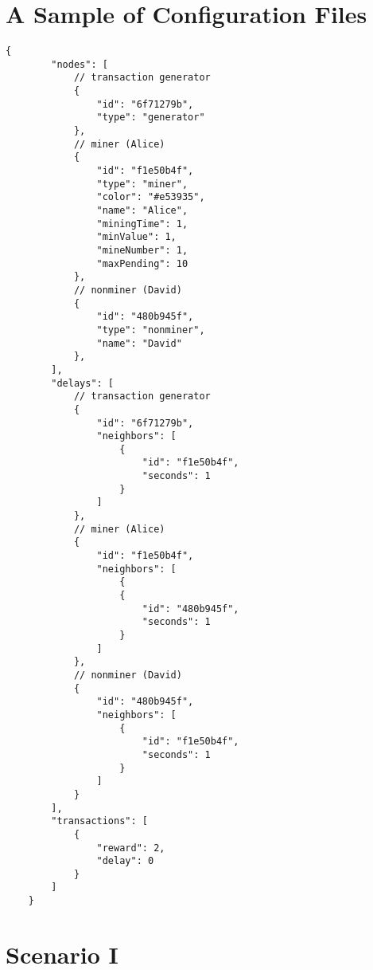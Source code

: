 \section{A Sample of Configuration Files}

\begin{lstlisting}[caption={Sample of Configuration File}, label={lst:sample of configuration file}]
    {
        "nodes": [
            // transaction generator
            {
                "id": "6f71279b",
                "type": "generator"
            },
            // miner (Alice)
            {
                "id": "f1e50b4f",
                "type": "miner",
                "color": "#e53935",
                "name": "Alice",
                "miningTime": 1,
                "minValue": 1,
                "mineNumber": 1,
                "maxPending": 10
            },
            // nonminer (David)
            {
                "id": "480b945f",
                "type": "nonminer",
                "name": "David"
            },
        ],
        "delays": [
            // transaction generator
            {
                "id": "6f71279b",
                "neighbors": [
                    {
                        "id": "f1e50b4f",
                        "seconds": 1
                    }
                ]
            },
            // miner (Alice)
            {
                "id": "f1e50b4f",
                "neighbors": [
                    {
                    {
                        "id": "480b945f",
                        "seconds": 1
                    }
                ]
            },
            // nonminer (David)
            {
                "id": "480b945f",
                "neighbors": [
                    {
                        "id": "f1e50b4f",
                        "seconds": 1
                    }
                ]
            }
        ],
        "transactions": [
            {
                "reward": 2,
                "delay": 0
            }
        ]
    }
\end{lstlisting}

\section{Scenario I}

